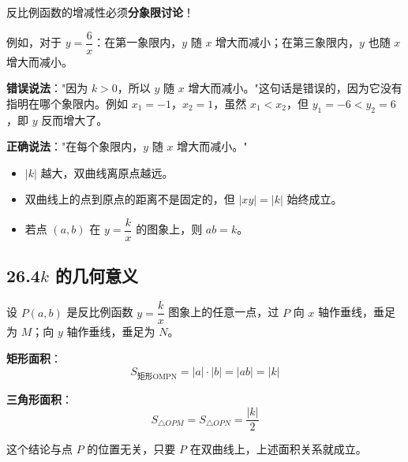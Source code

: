 \documentclass[12pt, a4paper]{ctexart}
\begin{document}
\begin{warnbox}
反比例函数的增减性必须\textbf{分象限讨论}！

\medskip
例如，对于 $y = \dfrac{6}{x}$：在第一象限内，$y$ 随 $x$ 增大而减小；在第三象限内，$y$ 也随 $x$ 增大而减小。

\medskip
\textbf{错误说法}："因为 $k > 0$，所以 $y$ 随 $x$ 增大而减小。"这句话是错误的，因为它没有指明在哪个象限内。例如 $x_1 = -1$，$x_2 = 1$，虽然 $x_1 < x_2$，但 $y_1 = -6 < y_2 = 6$，即 $y$ 反而增大了。

\medskip
\textbf{正确说法}："在每个象限内，$y$ 随 $x$ 增大而减小。"
\end{warnbox}

\begin{tipbox}[规律总结]
\begin{itemize}[leftmargin=2em]
  \item $|k|$ 越大，双曲线离原点越远。
  \item 双曲线上的点到原点的距离不是固定的，但 $|xy| = |k|$ 始终成立。
  \item 若点 $(a, b)$ 在 $y = \dfrac{k}{x}$ 的图象上，则 $ab = k$。
\end{itemize}
\end{tipbox}

\subsection*{26.4\quad $k$ 的几何意义}

\begin{knowledgebox}
设 $P(a, b)$ 是反比例函数 $y = \dfrac{k}{x}$ 图象上的任意一点，过 $P$ 向 $x$ 轴作垂线，垂足为 $M$；向 $y$ 轴作垂线，垂足为 $N$。

\begin{center}
\end{center}

\textbf{矩形面积}：
\[
  S_{\text{矩形OMPN}} = |a| \cdot |b| = |ab| = |k|
\]

\medskip
\textbf{三角形面积}：
\[
  S_{\triangle OPM} = S_{\triangle OPN} = \frac{|k|}{2}
\]

\medskip
这个结论与点 $P$ 的位置无关，只要 $P$ 在双曲线上，上述面积关系就成立。
\end{knowledgebox}
\end{document}

